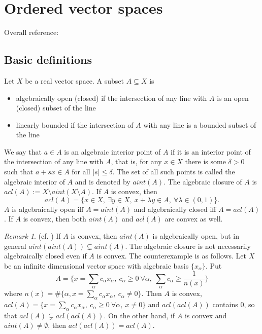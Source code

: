 \documentclass[12pt]{article}
\theoremstyle{remark}
\newtheorem{rem}{Remark}
\newcommand{\<}{\langle}
\begin{document}
\section{Ordered vector spaces }

Overall reference:  \cite{jameson}

\subsection{Basic definitions}

Let $X$ be a real vector space. A subset $A\subseteq X$ is 
\begin{itemize}
\item algebraically open (closed) if the intersection of any line with $A$ is an open (closed) subset of the line
\item linearly bounded if the intersection of $A$ with any line is  a bounded subset of the line
\end{itemize}
We say that $a\in A$ is an algebraic interior point of $A$ if it is an interior point of the intersection of any line with $A$, that is, 
for any $x\in X$ there is some $\delta>0$ such that $a+sx\in A$ for all $|s|\le \delta$. 
 The set of all such points is called the algebraic interior of $A$ and is denoted by $aint(A)$. The algebraic closure of $A$ is $acl(A):=X\setminus aint(X\setminus A)$.
If $A$ is convex, then
\[
acl(A)=\{x\in X,\ \exists y\in X,\ x+\lambda y\in A,\ \forall \lambda\in (0,1)\}.
\]
$A$ is algebraically open iff $A=aint(A)$ and algebraically closed iff $A=acl(A)$. If $A$ is convex, then both $aint(A)$ and $acl(A)$ are convex as well.

\begin{rem} (cf. \cite[\S 16]{kothe}) 
If $A$ is convex, then $aint(A)$ is algebraically open, but  in general $aint(aint(A))\subsetneq aint(A)$. The algebraic closure is not necessarily algebraically closed even if $A$ is convex. The counterexample is as follows. Let $X$ be an infinite dimensional vector space with algebraic basis $\{x_\alpha\}$. Put 
\[
A=\{ x=\sum_\alpha c_\alpha x_\alpha,\ c_\alpha\ge 0\ \forall \alpha,\ \sum_\alpha c_\alpha \ge \frac1{n(x)}\}
\]
where $n(x)=\#\{\alpha, x=\sum_\alpha c_\alpha x_\alpha,\ c_\alpha\ne 0\}$. Then $A$ is convex, $acl(A)=\{x=\sum_\alpha c_\alpha x_\alpha,\ c_\alpha\ge 0\  \forall \alpha,\ x\ne 0\}$ and $acl(acl(A))$ contains 0, so that $acl(A)\subsetneq acl(acl(A))$.
On the other hand, if $A$ is convex and $aint(A)\ne \emptyset$, then $acl(acl(A))=acl(A)$. \end{rem}
\end{document}
